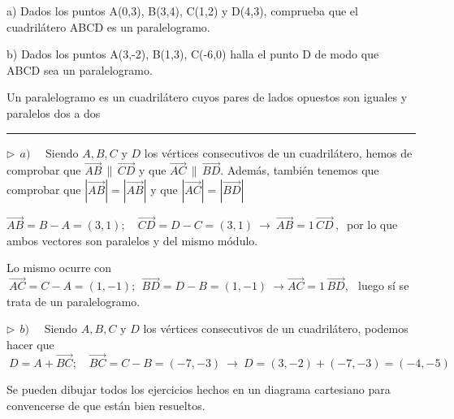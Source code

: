 \begin{miejercicio}

a)  Dados los puntos   A(0,3),   B(3,4),   C(1,2)   y   D(4,3), comprueba que el cuadrilátero   ABCD   es un paralelogramo.

\vspace{1mm} b) Dados los puntos   A(3,-2),   B(1,3),   C(-6,0)   halla el punto   D   de modo que   ABCD   sea un paralelogramo.

\vspace{2mm}\textcolor{gris}{Un paralelogramo es un cuadrilátero cuyos pares de lados opuestos son iguales y paralelos dos a dos}

\rule{250pt}{0.5pt}

\vspace{2mm} $\triangleright \ \ a)\quad $ Siendo $A,B,C \text{ y } D$ los vértices consecutivos de un cuadrilátero, hemos de comprobar que $\overrightarrow{AB}\, \parallel \, \overrightarrow{CD}$ y que $\overrightarrow{AC}\, \parallel \, \overrightarrow{BD}$. Además, también tenemos que comprobar que $|\overrightarrow{AB}|=|\overrightarrow{AB}|$ y que $|\overrightarrow{AC}|=|\overrightarrow{BD}|$

\vspace{2mm} $\overrightarrow{AB}=B-A=(3,1);\quad \overrightarrow{CD}=D-C=(3,1) \ \to \  \overrightarrow{AB}=1\, \overrightarrow{CD}\, , \ $ por lo que ambos vectores son paralelos y del mismo módulo.

\vspace{2mm} Lo mismo ocurre con $\ \overrightarrow{AC}=C-A=(1, -1);\ \ \overrightarrow{BD}=D-B=(1,-1) \ \to \overrightarrow{AC}=1\, \overrightarrow{BD}$, $\ $ luego sí se trata de un paralelogramo.

\vspace{4mm} $\triangleright \ \ b)\quad $ Siendo $A,B,C \text{ y } D$ los vértices consecutivos de un cuadrilátero, podemos hacer que $\ D=A+\overrightarrow{BC};\quad \overrightarrow{BC}=C-B=(-7,-3) \ \to \ D=(3,-2)+(-7,-3)=(-4,-5)$
\end{miejercicio}

\textcolor{gris}{Se pueden dibujar todos los ejercicios hechos en un diagrama cartesiano para convencerse de que están bien resueltos.}

